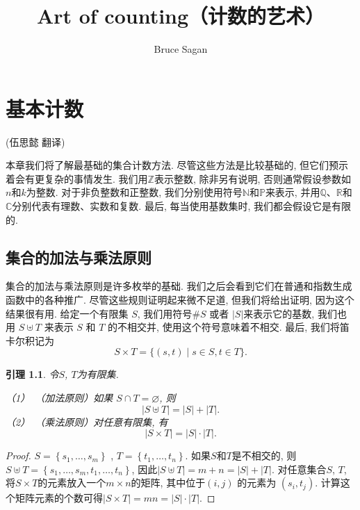 \documentclass{ctexbook}
\newtheorem{lem}[thm]{引理}
\begin{document}
\author{Bruce Sagan}
\title{Art of counting（计数的艺术）}
\date{}
\maketitle
\newpage
\chapter{基本计数}
\begin{center}
(伍思懿 \quad 翻译)
\end{center}


本章我们将了解最基础的集合计数方法. 尽管这些方法是比较基础的, 但它们预示着会有更复杂的事情发生. 我们用$\mathbb{Z}$表示整数,
除非另有说明, 否则通常假设参数如$n$和$k$为整数. 对于非负整数和正整数, 我们分别使用符号$\mathbb{N}$和$\mathbb{P}$来表示,
并用$\mathbb{Q}$、$\mathbb{R}$和$\mathbb{C}$分别代表有理数、实数和复数. 最后, 每当使用基数集时, 我们都会假设它是有限的.

\section{集合的加法与乘法原则}

集合的加法与乘法原则是许多枚举的基础. 我们之后会看到它们在普通和指数生成函数中的各种推广. 尽管这些规则证明起来微不足道,
但我们将给出证明, 因为这个结果很有用. 给定一个有限集 $S$, 我们用符号$\# S$ 或者 $|S|$来表示它的基数, 我们也用
$S \uplus T$ 来表示 $S$ 和 $T$ 的不相交并, 使用这个符号意味着不相交. 最后, 我们将笛卡尔积记为
$$ S \times T=\{(s, t) \mid s \in S, t \in T\}.$$

\begin{lem}
令$S$, $T$为有限集.

\noindent（1）\ （加法原则）如果 $S \cap T=\varnothing$, 则
$$|S \uplus T|=|S|+|T|.$$
（2）\ （乘法原则）对任意有限集, 有
$$|S \times T|=|S| \cdot|T|.$$
\end{lem}


\begin{proof}
$S=\left\{s_{1}, \ldots, s_{m}\right\}$ , $T=\left\{t_{1}, \ldots, t_{n}\right\} $. 如果$S$和$T$是不相交的, 则
$S\uplus T=\left\{s_{1}, \ldots, s_{m}, t_{1}, \ldots, t_{n}\right\}$, 因此$|S \uplus T|=m+n=|S|+|T|$.
对任意集合$S$, $T$, 将$S \times T$的元素放入一个$m \times n$的矩阵, 其中位于$(i, j)$ 的元素为 $\left(s_{i}, t_{j}\right)$.
计算这个矩阵元素的个数可得$|S \times T|=m n=|S| \cdot|T|$.
\end{proof}


%
\end{document}
